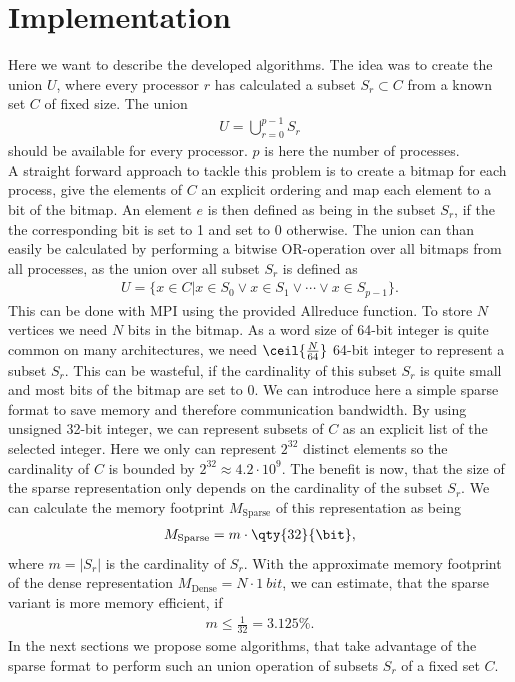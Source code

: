 
\chapter{Implementation} \label{Implementation}

Here we want to describe the developed algorithms. The idea was to create the union $U$, 
where every processor $r$ has calculated a subset $S_r\subset C$ from a known set $C$ of fixed size. The union
\begin{align}
	U = \bigcup_{r=0}^{p-1} S_r
\end{align}
should be available for every processor. $p$ is here the number of processes. \\
A straight forward approach to tackle this problem is to create a bitmap for each process, give the elements of $C$ an explicit ordering
and map each element to a bit of the bitmap. An element $e$ is then defined as being in the subset $S_r$, if the the corresponding 
bit is set to 1 and set to 0 otherwise. The union can than easily be calculated by performing a bitwise OR-operation over all 
bitmaps from all processes, as the union over all subset $S_r$ is defined as
\begin{align}
	U = \{x \in C | x \in S_0 \lor x \in S_1 \lor \cdots \lor x \in S_{p-1} \}.
\end{align}
This can be done with MPI using the provided Allreduce function. To store $N$ vertices we need $N$ bits in the bitmap.
As a word size of 64-bit integer is quite common on many architectures, we need $\ceil{\frac{N}{64}}$ 64-bit integer
to represent a subset $S_r$. This can be wasteful, if the cardinality of this subset $S_r$ is quite small and most bits of the bitmap are set to 0. We can introduce here a simple sparse format to save memory and therefore communication bandwidth. By using unsigned 32-bit integer, we can represent subsets of $C$ as an explicit list of the selected integer. Here we only can represent $2^{32}$ distinct elements so the cardinality of $C$ is bounded by $2^{32} \approx 4.2\cdot10^9$. The benefit is now, that the size of the sparse representation only depends on the cardinality of the subset $S_r$. We can calculate the memory footprint $M_\mathrm{Sparse}$ of this representation as being 
\begin{align}
	M_\mathrm{Sparse} = m \cdot \qty{32}{\bit},
\end{align}
where $m = |S_r|$ is the cardinality of $S_r$. With the approximate memory footprint of the dense representation $M_\mathrm{Dense} = N \cdot \qty{1}{bit}$, we can estimate, that the sparse variant is more memory efficient, if
\begin{align}
	m \leq \frac{1}{32} = 3.125 \%.
\end{align}
In the next sections we propose some algorithms, that take advantage of the sparse format to perform such an union operation of subsets $S_r$ of a fixed set $C$.


